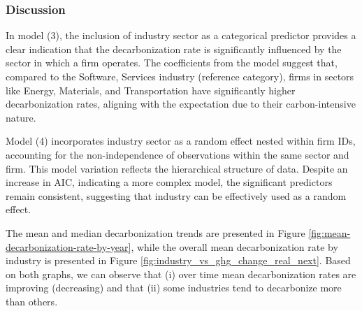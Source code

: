 




\subsubsection{Discussion}
In model (3), the inclusion of industry sector as a categorical predictor provides a clear indication that the decarbonization rate is significantly influenced by the sector in which a firm operates. The coefficients from the model suggest that, compared to the Software, Services industry (reference category), firms in sectors like Energy, Materials, and Transportation have significantly higher decarbonization rates, aligning with the expectation due to their carbon-intensive nature.


Model (4) incorporates industry sector as a random effect nested within firm IDs, accounting for the non-independence of observations within the same sector and firm. This model variation reflects the hierarchical structure of data. Despite an increase in AIC, indicating a more complex model, the significant predictors remain consistent, suggesting that industry can be effectively used as a random effect.


The mean and median decarbonization trends are presented in Figure \ref{fig:mean-decarbonization-rate-by-year}, while the overall mean decarbonization rate by industry is presented in Figure \ref{fig:industry_vs_ghg_change_real_next}. Based on both graphs, we can observe that (i) over time mean decarbonization rates are improving (decreasing) and that (ii) some industries tend to decarbonize more than others.


